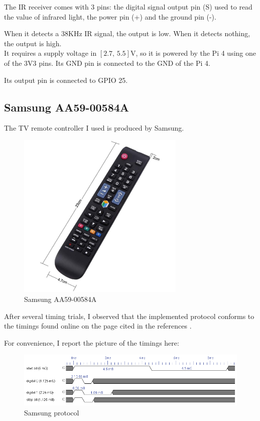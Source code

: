 \documentclass[a4paper, 12pt]{article}
\begin{document}
The IR receiver comes with 3 pins: the digital signal output pin (S) used to read the value of infrared light, the power pin (+) and the ground pin (-).

When it detects a 38KHz IR signal, the output is low. When it detects nothing, the output is high. \\
It requires a supply voltage in $[2.7, \, 5.5]$V, so it is powered by the Pi 4 using one of the 3V3 pins. Its GND pin is connected to the GND of the Pi 4.

Its output pin is connected to GPIO 25.

\subsection{Samsung AA59-00584A}

The TV remote controller I used is produced by Samsung.

\begin{figure}[h]
    \centering
    \includegraphics[width=8cm]{remote_controller}
    \caption{Samsung AA59-00584A}
\end{figure}

After several timing trials, I observed that the implemented protocol conforms to the timings found online on the page cited in the references \cite{8Samsung}. 

For convenience, I report the picture of the timings here:

\begin{figure}[h]
    \centering
    \includegraphics[width=15cm]{8_samsung}
    \caption{Samsung protocol}
\end{figure}
\end{document}

